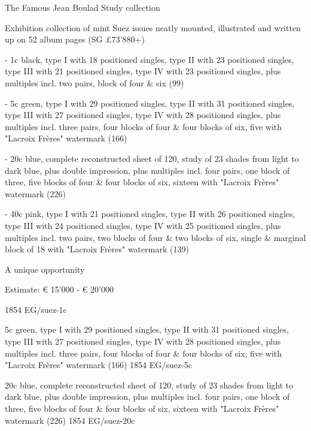 \documentclass[justified]{tufte-book}
\begin{document}
%
{The Famous Jean Boulad Study collection

Exhibition collection of mint Suez issues neatly mounted, illustrated and written up on 52 album pages (SG £73'880+)

- 1c black, type I with 18 positioned singles, type II with 23 positioned singles, type III with 21 positioned singles, type IV with 23 positioned singles, plus multiples incl. two pairs, block of four \& six (99) 

- 5c green, type I with 29 positioned singles, type II with 31 positioned singles, type III with 27 positioned singles, type IV with 28 positioned singles, plus multiples incl. three pairs, four blocks of four \& four blocks of six, five with "Lacroix Frères" watermark (166)

- 20c blue, complete reconstructed sheet of 120, study of 23 shades from light to dark blue, plus double impression, plus multiples incl. four pairs, one block of three, five blocks of four \& four blocks of six, sixteen with "Lacroix Frères" watermark (226)

- 40c pink, type I with 21 positioned singles, type II with 26 positioned singles, type III with 24 positioned singles, type IV with 25 positioned singles, plus multiples incl. two pairs, two blocks of four & two blocks of six, single \& marginal block of 18 with "Lacroix Frères" watermark (139)

A unique opportunity

Estimate: € 15'000 - € 20'000
}
{1854}%
{EG/suez-1c}%
{}%
{}
{}%
{}

%
{5c green, type I with 29 positioned singles, type II with 31 positioned singles, type III with 27 positioned singles, type IV with 28 positioned singles, plus multiples incl. three pairs, four blocks of four \& four blocks of six, five with "Lacroix Frères" watermark (166)
}
{1854}%
{EG/suez-5c}%
{}%
{}
{}%
{}

%
{ 20c blue, complete reconstructed sheet of 120, study of 23 shades from light to dark blue, plus double impression, plus multiples incl. four pairs, one block of three, five blocks of four \& four blocks of six, sixteen with "Lacroix Frères" watermark (226)
}
{1854}%
{EG/suez-20c}%
{}%
{}
{}%
{}
\end{document}
